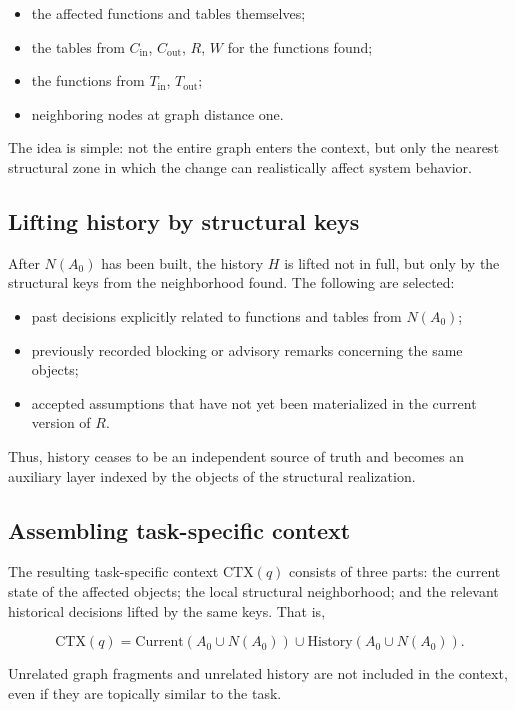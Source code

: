 \begin{itemize}
\item the affected functions and tables themselves;
\item the tables from $C_{\mathrm{in}}$, $C_{\mathrm{out}}$, $R$, $W$ for the functions found;
\item the functions from $T_{\mathrm{in}}$, $T_{\mathrm{out}}$;
\item neighboring nodes at graph distance one.
\end{itemize}

The idea is simple: not the entire graph enters the context, but only the nearest structural zone in which the change can realistically affect system behavior.

\subsection{Lifting history by structural keys}

After $N(A_0)$ has been built, the history $H$ is lifted not in full, but only by the structural keys from the neighborhood found. The following are selected:

\begin{itemize}
\item past decisions explicitly related to functions and tables from $N(A_0)$;
\item previously recorded blocking or advisory remarks concerning the same objects;
\item accepted assumptions that have not yet been materialized in the current version of $R$.
\end{itemize}

Thus, history ceases to be an independent source of truth and becomes an auxiliary layer indexed by the objects of the structural realization.

\subsection{Assembling task-specific context}

The resulting task-specific context $\mathrm{CTX}(q)$ consists of three parts: the current state of the affected objects; the local structural neighborhood; and the relevant historical decisions lifted by the same keys. That is,


$$\mathrm{CTX}(q) = \mathrm{Current}(A_0 \cup N(A_0)) \cup \mathrm{History}(A_0 \cup N(A_0)).$$

Unrelated graph fragments and unrelated history are not included in the context, even if they are topically similar to the task.

